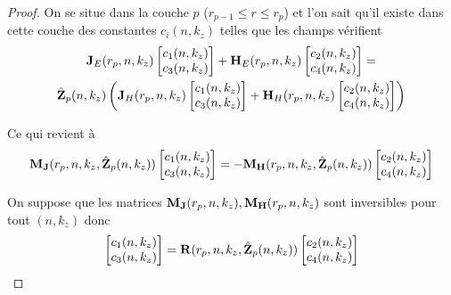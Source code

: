     \begin{proof}
      On se situe dans la couche \(p\) (\(r_{p-1}\le r\le r_p\)) et l'on sait qu'il existe dans cette couche des constantes \(c_i(n,k_z)\) telles que les champs vérifient
      \begin{multline*}
        \mathbf{J}_{E}(r_{p},n,k_z)
        \begin{bmatrix}
          c_1(n,k_z) \\
          c_3(n,k_z)
        \end{bmatrix}
        +
        \mathbf{H}_{E}(r_{p},n,k_z)
        \begin{bmatrix}
          c_2(n,k_z) \\
          c_4(n,k_z)
        \end{bmatrix}
        =
        \\
        \hat {\mathbf{Z}}_{p}(n,k_z)
        \left(
          \mathbf{J}_{H}(r_{p},n,k_z)
          \begin{bmatrix}
            c_1(n,k_z) \\
            c_3(n,k_z)
          \end{bmatrix}
          +
          \mathbf{H}_{H}(r_{p},n,k_z)
          \begin{bmatrix}
            c_2(n,k_z) \\
            c_4(n,k_z)
          \end{bmatrix}
        \right)
      \end{multline*}

      Ce qui revient à 
      \begin{equation*}
        \mathbf{M}_{\mathbf{J}}(r_{p},n,k_z,\hat{\mathbf{Z}}_p(n,k_z))
        \begin{bmatrix}
          c_1(n,k_z) \\
          c_3(n,k_z)
        \end{bmatrix}
        =
        -\mathbf{M}_{\mathbf{H}}(r_{p},n,k_z,\hat{\mathbf{Z}}_p(n,k_z))
        \begin{bmatrix}
          c_2(n,k_z) \\
          c_4(n,k_z)
        \end{bmatrix}
      \end{equation*}

      On suppose que les matrices \(\mathbf{M}_{\mathbf{J}}(r_p,n,k_z), \mathbf{M}_{\mathbf{H}}(r_p,n,k_z)\) sont inversibles pour tout \((n,k_z)\) donc
      \begin{equation*}
        \begin{bmatrix}
          c_1(n,k_z) \\
          c_3(n,k_z)
        \end{bmatrix}
        =
        \mathbf{R}(r_{p},n,k_z,\hat{\mathbf{Z}}_p(n,k_z))
        \begin{bmatrix}
          c_2(n,k_z) \\
          c_4(n,k_z)
        \end{bmatrix}
      \end{equation*}


\end{proof}
